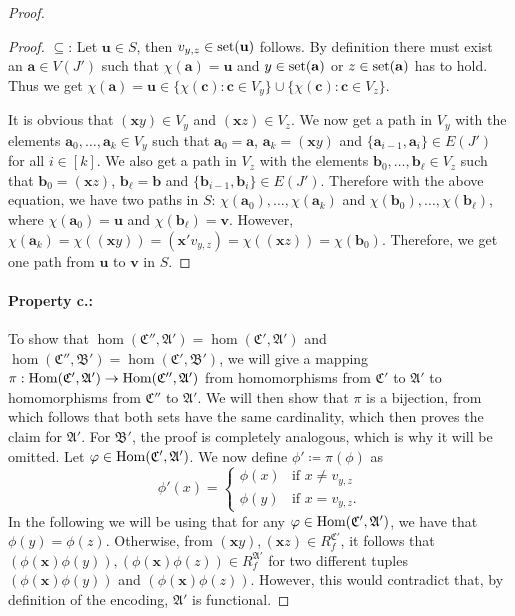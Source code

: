\begin{proof}
\begin{proof}
		$\subseteq$:
		Let $\mathbf u\in S$, then $v_{y,z}\in \operatorname{set}(\mathbf u)$ follows.
		By definition there must exist an $\mathbf a \in V(J')$ such that $\chi(\mathbf a)=\mathbf u$ and $y\in \operatorname{set}(\mathbf a)$ or $z\in \operatorname{set}(\mathbf a)$ has to hold.
		Thus we get $\chi(\mathbf a)=\mathbf u\in \{\chi(\mathbf c) : \mathbf c\in V_y\}\cup \{\chi(\mathbf c) : \mathbf c\in V_z\}$.
		
		It is obvious that $(\mathbf xy)\in V_y$ and $(\mathbf xz)\in V_z$.
		We now get a path in $V_y$ with the elements $\mathbf a_0,\dots,\mathbf a_k\in V_y$ such that $\mathbf a_0=\mathbf a$, $\mathbf a_k=(\mathbf xy)$ and $\{\mathbf a_{i-1},\mathbf a_i\}\in E(J')$ for all $i\in [k]$.
		We also get a path in $V_z$ with the elements $\mathbf b_0,\dots,\mathbf b_\ell\in V_z$ such that $\mathbf b_0=(\mathbf xz)$, $\mathbf b_\ell = \mathbf b$ and $\{\mathbf b_{i-1},\mathbf b_i\}\in E(J')$.
		Therefore with the above equation, we have two paths in $S$: $\chi(\mathbf a_0),\dots,\chi(\mathbf a_k)$ and $\chi(\mathbf b_0),\dots,\chi(\mathbf b_\ell)$, where $\chi(\mathbf a_0)=\mathbf u$ and $\chi(\mathbf b_\ell)=\mathbf v$.
		However, $\chi(\mathbf a_k)=\chi((\mathbf xy))=(\mathbf x'v_{y,z})=\chi((\mathbf xz))=\chi(\mathbf b_0)$.
		Therefore, we get one path from $\mathbf u$ to $\mathbf v$ in $S$.
	\end{proof}
	
	\paragraph*{Property c.:}
	To show that $\hom(\mathfrak C'',\mathfrak A')=\hom(\mathfrak C',\mathfrak A')$ and $\hom(\mathfrak C'',\mathfrak B')=\hom(\mathfrak C',\mathfrak B')$, we will give a mapping $\pi : \operatorname{Hom}(\mathfrak C',\mathfrak A')\to\operatorname{Hom}(\mathfrak C'',\mathfrak A')$ from homomorphisms from $\mathfrak C'$ to $\mathfrak A'$ to homomorphisms from $\mathfrak C''$ to $\mathfrak A'$.
	We will then show that $\pi$ is a bijection, from which follows that both sets have the same cardinality, which then proves the claim for $\mathfrak A'$.
	For $\mathfrak B'$, the proof is completely analogous, which is why it will be omitted.
	Let $\varphi\in \operatorname{Hom}(\mathfrak C',\mathfrak A')$.
	We now define $\phi'\coloneqq \pi(\phi)$ as
	$$
	\phi'(x)=
	\begin{cases}
		\phi(x) & \text{if } x\neq v_{y,z} \\
		\phi(y) & \text{if } x = v_{y,z}.
	\end{cases}
	$$
	In the following we will be using that for any $\varphi\in\operatorname{Hom}(\mathfrak C',\mathfrak A')$, we have that $\phi(y)=\phi(z)$.
	Otherwise, from $(\mathbf xy),(\mathbf xz)\in R_f^{\mathfrak C'}$, it follows that $(\phi(\mathbf x)\phi(y)),(\phi(\mathbf x)\phi(z))\in R_f^{\mathfrak A'}$ for two different tuples $(\phi(\mathbf x)\phi(y))$ and $(\phi(\mathbf x)\phi(z))$.
	However, this would contradict that, by definition of the encoding, $\mathfrak A'$ is functional.
	

\end{proof}
